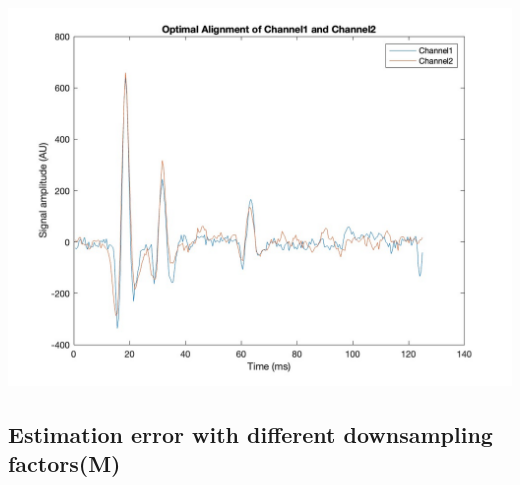 \documentclass[8pt]{article}  %
\theoremstyle{plain}
\theoremstyle{definition}
\theoremstyle{remark}
\begin{document}
    \begin{minipage}{0.5\textwidth}  
    \centering  
    \includegraphics[width=\linewidth]{figure/figure_1.jpg}  
    \end{minipage}

    \vspace{0.5cm}

    \subsection{Estimation error with different downsampling factors(M)}
    
\end{document}
